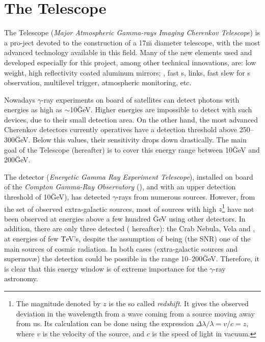 
\chapter{The \MAGIC Telescope}
\label{chapter:magic}

The  Telescope (\emph{Major Atmospheric Gamma-rays Imaging
  Cherenkov Telescope}) is a pro-ject devoted to the construction of a
17\u{m} diameter \Cherenkov telescope, with the most advanced
technology available in this field. Many of the new elements used and
developed especially for this project, among other technical
innovations, are: low weight, high reflectivity coated aluminum
mirrors; , fast s,  links, fast slew for s observation, multilevel
trigger, atmospheric monitoring, etc.

Nowadays $\gamma$-ray experiments on board of satellites can detect
photons with energies as high as $\sim$10\u{GeV}. Higher energies are
impossible to detect with such devices, due to their small detection
area.  On the other hand, the most advanced Cherenkov detectors
currently operatives have a detection threshold above 250--300\u{GeV}.
Below this values, their sensitivity drops down drastically. The main
goal of the \MAGIC Telescope (\MAGIC hereafter) is to cover this
energy range between 10\u{GeV} and 200\u{GeV}.
%
\energygapfig

The detector  (\emph{Energetic Gamma Ray Experiment
  Telescope}), installed on board of the \emph{Compton Gamma-Ray
  Observatory} (), and with an upper detection threshold of
10\u{GeV}), has detected $\gamma$-rays from numerous sources.
However, from the set of observed extra-galactic
sources, most of sources with high %
%
$z$\footnote{The magnitude denoted by $z$ is the so called
  \emph{redshift}.  It gives the observed deviation in the wavelength
  from a wave coming from a source moving away from us.  Its
  calculation can be done using the expression
  $\Delta\lambda/\lambda=v/c=z$, where $v$ is the velocity of the
  source, and $c$ is the speed of light in vacuum.} %
%
have not been observed at energies above a few hundred \u{GeV} using
other detectors.  In addition, there are only three detected
\emph{} ( hereafter): the Crab
Nebula, Vela and , at energies of few \u{TeV}'s, despite
the assumption of being (the SNR) one of the main sources of cosmic
radiation.  In both cases (extra-galactic sources and supernov{\ae}) the
detection could be possible in the range 10--200\u{GeV}.  Therefore,
it is clear that this energy window is of extreme importance for the
$\gamma$-ray astronomy.

